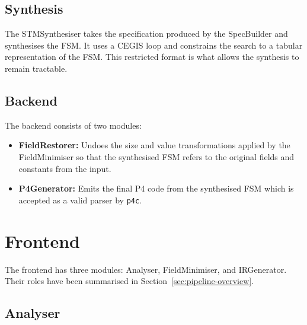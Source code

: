 \subsection*{Synthesis}

The STMSynthesiser takes the specification produced by the SpecBuilder and synthesises the FSM. It uses a CEGIS loop and constrains the search to a tabular representation of the FSM. 
This restricted format is what allows the synthesis to remain tractable.

\subsection*{Backend}

The backend consists of two modules:

\begin{itemize}
    \item \textbf{FieldRestorer:} Undoes the size and value transformations applied by the FieldMinimiser so that the synthesised FSM refers to the original fields and constants from the input.

    \item \textbf{P4Generator:} Emits the final P4 code from the synthesised FSM which is accepted as a valid parser by \texttt{p4c}.
\end{itemize}

\section{Frontend}
\label{sec:frontend}

The frontend has three modules: Analyser, FieldMinimiser, and IRGenerator. Their roles have been summarised in Section~\ref{sec:pipeline-overview}.

\subsection{Analyser}

